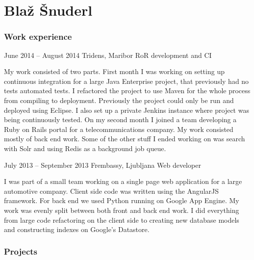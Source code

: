 \documentclass{tccv}
\begin{document}
\part{Blaž Šnuderl}

\section{Work experience}

\begin{eventlist}

\item{June 2014 -- August 2014}
     {Tridens, Maribor}
     {RoR development and CI}

My work consisted of two parts. First month I was working on setting up continuous integration for a large Java Enterprise project, that previously had no tests automated tests. I refactored the project to use Maven for the whole process from compiling to deployment. Previously the project could only be run and deployed using Eclipse. I also set up a private Jenkins instance where project was being continuously tested. 
\newline
On my second month I joined a team developing a Ruby on Rails portal for a telecommunications company. My work consisted mostly of back end work. Some of the other stuff I ended working on was search with Solr and using Redis as a background job queue.

\item{July 2013 -- September 2013}
     {Frembassy, Ljubljana}
     {Web developer}
     
I was part of a small team working on a single page web application for a large automotive company. Client side code was written using the AngularJS framework. For back end we used Python running on Google App Engine. My work was evenly split between both front and back end work. I did everything from large code refactoring on the client side to creating new database models and constructing indexes on Google's Datastore.

\end{eventlist}


\section{Projects}
\end{document}
